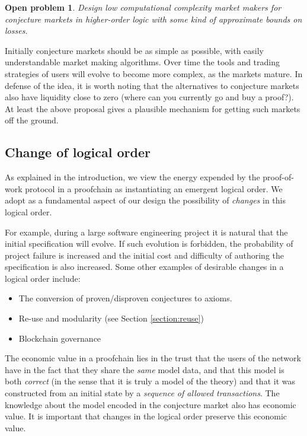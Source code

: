 \documentclass[english,letter paper,12pt,reqno]{article}
\theoremstyle{example}
\newtheorem{problem}[theorem]{Open problem}
\begin{document}
\begin{problem} Design low computational complexity market makers for conjecture markets in higher-order logic with some kind of approximate bounds on losses.
\end{problem}

Initially conjecture markets should be as simple as possible, with easily understandable market making algorithms. Over time the tools and trading strategies of users will evolve to become more complex, as the markets mature. In defense of the idea, it is worth noting that the alternatives to conjecture markets also have liquidity close to zero (where can you currently go and buy a proof?). At least the above proposal gives a plausible mechanism for getting such markets off the ground.

\subsection{Change of logical order}\label{section:change_of_logic}

As explained in the introduction, we view the energy expended by the proof-of-work protocol in a proofchain as instantiating an emergent logical order. We adopt as a fundamental aspect of our design the possibility of \emph{changes} in this logical order. 

For example, during a large software engineering project it is natural that the initial specification will evolve. If such evolution is forbidden, the probability of project failure is increased and the initial cost and difficulty of authoring the specification is also increased. Some other examples of desirable changes in a logical order include:

\begin{itemize}
\item The conversion of proven/disproven conjectures to axioms.
\item Re-use and modularity (see Section \ref{section:reuse})
\item Blockchain governance
\end{itemize}

The economic value in a proofchain lies in the trust that the users of the network have in the fact that they share the \emph{same} model data, and that this model is both \emph{correct} (in the sense that it is truly a model of the theory) and that it was constructed from an initial state by a \emph{sequence of allowed transactions}. The knowledge about the model encoded in the conjecture market also has economic value. It is important that changes in the logical order preserve this economic value.
\vspace{0.2cm}
\end{document}

